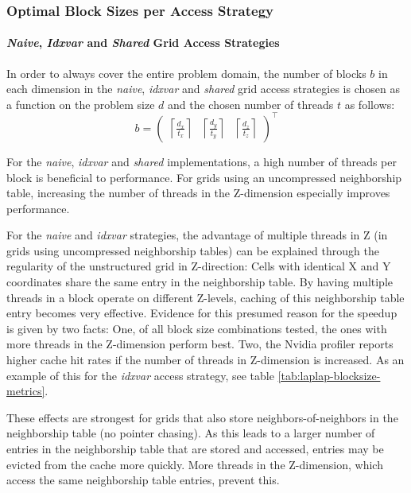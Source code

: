 \subsubsection{Optimal Block Sizes per Access Strategy}

\paragraph{\emph{Naive}, \emph{Idxvar} and \emph{Shared} Grid Access Strategies}
In order to always cover the entire problem domain, the number of blocks $b$ in each dimension in the \emph{naive}, \emph{idxvar} and \emph{shared} grid access strategies is chosen as a function on the problem size $d$ and the chosen number of threads $t$ as follows:
$$b = \begin{pmatrix}\left\lceil\frac{d_x}{t_x}\right\rceil & \left\lceil\frac{d_y}{t_y}\right\rceil & \left\lceil\frac{d_z}{t_z}\right\rceil\end{pmatrix}^\top$$

For the \emph{naive}, \emph{idxvar} and \emph{shared} implementations, a high number of threads per block is beneficial to performance. For grids using an uncompressed neighborship table, increasing the number of threads in the Z-dimension especially improves performance.

For the \emph{naive} and \emph{idxvar} strategies, the advantage of multiple threads in Z (in grids using uncompressed neighborship tables) can be explained through the regularity of the unstructured grid in Z-direction: Cells with identical X and Y coordinates share the same entry in the neighborship table. By having multiple threads in a block operate on different Z-levels, caching of this neighborship table entry becomes very effective. Evidence for this presumed reason for the speedup is given by two facts: One, of all block size combinations tested, the ones with more threads in the Z-dimension perform best. Two, the Nvidia profiler reports higher cache hit rates if the number of threads in Z-dimension is increased. As an example of this for the \emph{idxvar} access strategy, see table \ref{tab:laplap-blocksize-metrics}.

These effects are strongest for grids that also store neighbors-of-neighbors in the neighborship table (no pointer chasing). As this leads to a larger number of entries in the neighborship table that are stored and accessed, entries may be evicted from the cache more quickly. More threads in the Z-dimension, which access the same neighborship table entries, prevent this.

